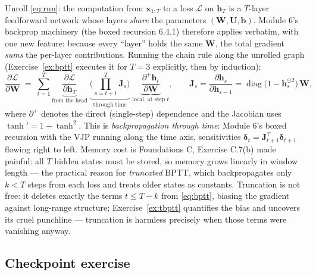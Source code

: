 \documentclass[11pt]{article}
\numberwithin{equation}{section}
\theoremstyle{plain}
\theoremstyle{definition}
\theoremstyle{remark}
\newcounter{exercise}
\DeclareMathOperator{\diag}{diag}
\newcommand{\x}{\bm{x}}
\newcommand{\T}{\top}
\newcommand{\bh}{\bm{h}}
\newcommand{\bW}{\bm{W}}
\newcommand{\bU}{\bm{U}}
\newcommand{\bJ}{\bm{J}}
\begin{document}
Unroll \eqref{eq:rnn}: the computation from $\x_{1:T}$ to a loss $\mathcal{L}$ on $\bh_T$ is a $T$-layer feedforward network whose layers \emph{share} the parameters $(\bW, \bU, \bm b)$. Module 6's backprop machinery (the boxed recursion 6.4.1) therefore applies verbatim, with one new feature: because every ``layer'' holds the same $\bW$, the total gradient \emph{sums} the per-layer contributions. Running the chain rule along the unrolled graph (Exercise~\ref{ex:bptt} executes it for $T = 3$ explicitly, then by induction):
\begin{equation}
\frac{\partial \mathcal{L}}{\partial \bW}
\;=\; \sum_{t=1}^{T}
\underbrace{\frac{\partial \mathcal{L}}{\partial \bh_T}}_{\text{from the head}}
\;\underbrace{\Bigg( \prod_{s = t+1}^{T} \bJ_s \Bigg)}_{\text{through time}}
\;\underbrace{\frac{\partial^{+} \bh_t}{\partial \bW}}_{\text{local, at step } t},
\qquad
\bJ_s = \frac{\partial \bh_s}{\partial \bh_{s-1}} = \diag\!\big(1 - \bh_s^{\odot 2}\big)\, \bW,
\label{eq:bptt}
\end{equation}
where $\partial^{+}$ denotes the direct (single-step) dependence and the Jacobian uses $\tanh' = 1 - \tanh^2$. This is \emph{backpropagation through time}: Module 6's boxed recursion with the VJP running along the time axis, sensitivities $\bm\delta_t = \bJ_{t+1}^\T \bm\delta_{t+1}$ flowing right to left. Memory cost is Foundations C, Exercise C.7(b) made painful: all $T$ hidden states must be stored, so memory grows linearly in window length --- the practical reason for \emph{truncated} BPTT, which backpropagates only $k < T$ steps from each loss and treats older states as constants. Truncation is not free: it deletes exactly the terms $t \le T - k$ from \eqref{eq:bptt}, biasing the gradient against long-range structure; Exercise~\ref{ex:tbptt} quantifies the bias and uncovers its cruel punchline --- truncation is harmless precisely when those terms were vanishing anyway.


\subsection*{Checkpoint exercise}
\end{document}
